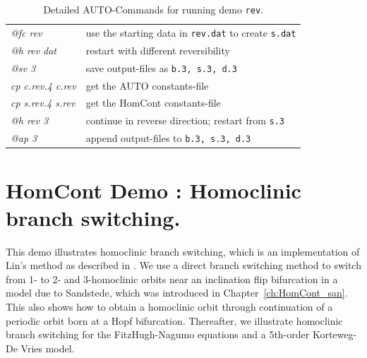 \documentclass[12pt]{report}
\begin{document}
\begin{table}[htbp]
\begin{center}
\begin{tabular}{| l | l |}
  {\it @fc rev} & use the starting data in {\tt rev.dat} to create {\tt s.dat} \\ 
  {\it @h rev dat} & restart with different reversibility \\ 
  {\it @sv 3} & save output-files as {\tt b.3, s.3, d.3} \\ 
\hline
  {\it cp c.rev.4 c.rev} & get the AUTO constants-file \\ 
  {\it cp s.rev.4 s.rev} & get the HomCont constants-file \\ 
  {\it @h rev 3} & continue in reverse direction; restart from {\tt s.3} \\ 
  {\it @ap 3} & append output-files to {\tt b.3, s.3, d.3} \\ 
\hline
\end{tabular}
\caption{Detailed {\cal AUTO}-Commands for running demo {\tt rev}.}
\label{tbl:demo_rev_1}
\end{center}
\end{table}

\chapter{ {\cal HomCont} Demo : Homoclinic branch switching.} \label{ch:HomCont_hbs}


This demo illustrates homoclinic branch switching, which is an
implementation of Lin's method \cite{Li:90,Sa:93,Ye:01}
as described in . We use a
direct branch switching method to switch from 1- to 2- and
3-homoclinic orbits near an inclination flip bifurcation 
in a model due to Sandstede, 
which was introduced in Chapter~\ref{ch:HomCont_san}.
This also shows how to obtain a homoclinic orbit through continuation
of a periodic orbit born at a Hopf bifurcation.
Thereafter, we illustrate homoclinic branch switching for the
FitzHugh-Nagumo equations and a 5th-order Korteweg-De Vries model.
\end{document}

